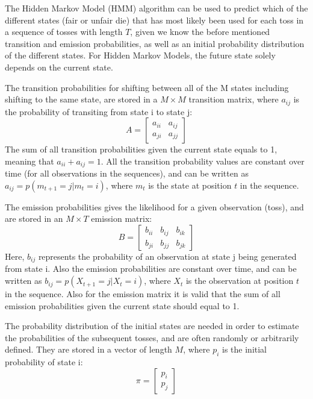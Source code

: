 The Hidden Markov Model (HMM) algorithm can be used to predict which of the different states (fair or unfair die) that has most likely been used for each toss in a sequence of tosses with length $T$, given we know the before mentioned transition and emission probabilities, as well as an initial probability distribution of the different states. For Hidden Markov Models, the future state solely depends on the current state. 

The transition probabilities for shifting between all of the M states including shifting to the same state, are stored in a $M\times M$ transition matrix, where $a_{ij}$ is the probability of transiting from state i to state j: 
\begin{equation*}
    A = 
    \begin{bmatrix}
        a_{ii} & a_{ij} \\
        a_{ji} & a_{jj}
    \end{bmatrix}
\end{equation*}
The sum of all transition probabilities given the current state equals to 1, meaning that $a_{ii}+a_{ij} = 1$. All the transition probability values are constant over time (for all observations in the sequences), and can be written as
$a_{ij} = p(m_{t+1} = j | m_{t} = i)$, where $m_t$ is the state at position $t$ in the sequence.  

The emission probabilities gives the likelihood for a given observation (toss), and are stored in an $M \times T$ emission matrix:
\begin{equation*}
    B = 
    \begin{bmatrix}
        b_{ii} & b_{ij} & b_{ik}\\
        b_{ji} & b_{jj} & b_{jk}
    \end{bmatrix}
\end{equation*}
Here, $b_{ij}$ represents the probability of an observation at state j being generated from state i. Also the emission probabilities are constant over time, and can be written as $b_{ij} = p(X_{t+1} = j | X_{t} = i)$, where $X_t$ is the observation at position $t$ in the sequence. Also for the emission matrix it is valid that the sum of all emission probabilities given the current state should equal to 1.

The probability distribution of the initial states are needed in order to estimate the probabilities of the subsequent tosses, and are often randomly or arbitrarily defined. They are stored in a vector of length $M$, where $p_{i}$ is the initial probability of state i:
\begin{equation*}
    \pi = 
    \begin{bmatrix}
        p_{i}\\
        p_{j}
    \end{bmatrix}
\end{equation*}

